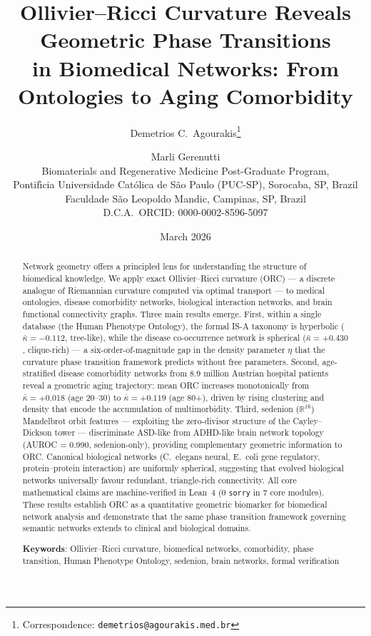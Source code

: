\documentclass[11pt,a4paper]{article}
\title{Ollivier--Ricci Curvature Reveals Geometric Phase Transitions\\in Biomedical Networks: From Ontologies to Aging Comorbidity}
\author{%
  Demetrios C.\ Agourakis\thanks{Correspondence: \texttt{demetrios@agourakis.med.br}}%
  \and
  Marli Gerenutti%
  \\[6pt]
  \small Biomaterials and Regenerative Medicine Post-Graduate Program,\\
  \small Pontif\'{\i}cia Universidade Cat\'olica de S\~ao Paulo (PUC-SP),
         Sorocaba, SP, Brazil\\
  \small Faculdade S\~ao Leopoldo Mandic, Campinas, SP, Brazil\\[3pt]
  \small D.C.A.\ ORCID: 0000-0002-8596-5097
}
\date{March 2026}
\newcommand{\kbar}{\bar{\kappa}}
\begin{document}
\maketitle

\begin{abstract}
Network geometry offers a principled lens for understanding the structure of biomedical knowledge. We apply exact Ollivier--Ricci curvature (ORC) --- a discrete analogue of Riemannian curvature computed via optimal transport --- to medical ontologies, disease comorbidity networks, biological interaction networks, and brain functional connectivity graphs. Three main results emerge. First, within a single database (the Human Phenotype Ontology), the formal IS-A taxonomy is hyperbolic ($\kbar = -0.112$, tree-like), while the disease co-occurrence network is spherical ($\kbar = +0.430$, clique-rich) --- a six-order-of-magnitude gap in the density parameter $\eta$ that the curvature phase transition framework predicts without free parameters. Second, age-stratified disease comorbidity networks from 8.9 million Austrian hospital patients reveal a geometric aging trajectory: mean ORC increases monotonically from $\kbar = +0.018$ (age 20--30) to $\kbar = +0.119$ (age 80+), driven by rising clustering and density that encode the accumulation of multimorbidity. Third, sedenion ($\mathbb{R}^{16}$) Mandelbrot orbit features --- exploiting the zero-divisor structure of the Cayley--Dickson tower --- discriminate ASD-like from ADHD-like brain network topology (AUROC = 0.990, sedenion-only), providing complementary geometric information to ORC. Canonical biological networks (C.~elegans neural, E.~coli gene regulatory, protein--protein interaction) are uniformly spherical, suggesting that evolved biological networks universally favour redundant, triangle-rich connectivity. All core mathematical claims are machine-verified in Lean~4 (0 \texttt{sorry} in 7 core modules). These results establish ORC as a quantitative geometric biomarker for biomedical network analysis and demonstrate that the same phase transition framework governing semantic networks extends to clinical and biological domains.

\medskip\noindent
\textbf{Keywords}: Ollivier--Ricci curvature, biomedical networks, comorbidity, phase transition, Human Phenotype Ontology, sedenion, brain networks, formal verification
\end{abstract}

\end{document}

